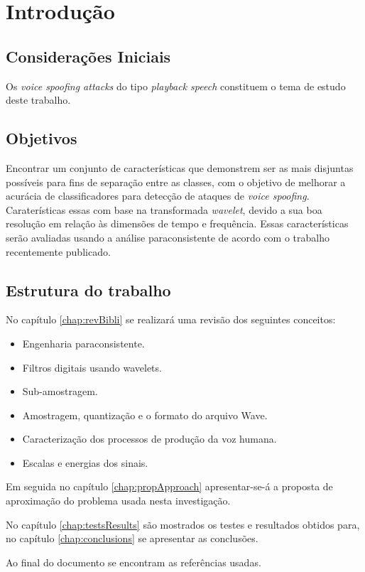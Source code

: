 \chapter{Introdução}
	\begin{myenv}{1.5}
		\section{Considerações Iniciais}
			\par Os \textit{voice spoofing attacks} do tipo \textit{playback speech} constituem o tema de estudo deste trabalho.
						 
		\section{Objetivos}
			\par Encontrar um conjunto de características que demonstrem ser as mais disjuntas possíveis para fins de separação entre as classes, com o objetivo de melhorar a acurácia de classificadores para detecção de ataques de \textit{voice spoofing}. Caraterísticas essas com base na transformada \textit{wavelet}, devido a sua boa resolução em relação às dimensões de tempo e frequência. Essas características serão avaliadas usando a análise paraconsistente de acordo com o trabalho \cite{8588433} recentemente publicado.
			
		\section{Estrutura do trabalho}
			\par No capítulo \ref{chap:revBibli} se realizará uma revisão dos seguintes conceitos:
			\begin{itemize}
				\item Engenharia paraconsistente.
				\item Filtros digitais usando wavelets.
				\item Sub-amostragem.
				\item Amostragem, quantização e o formato do arquivo Wave.
				\item Caracterização dos processos de produção da voz humana.
				\item Escalas e energias dos sinais.
			\end{itemize}
			\par Em seguida no capítulo \ref{chap:propApproach} apresentar-se-á a proposta de aproximação do problema usada nesta investigação. 
			\par No capítulo \ref{chap:testsResults} são mostrados os testes e resultados obtidos para, no capítulo \ref{chap:conclusions} se apresentar as conclusões.
			\par Ao final do documento se encontram as referências usadas.
		
		
	\end{myenv}
